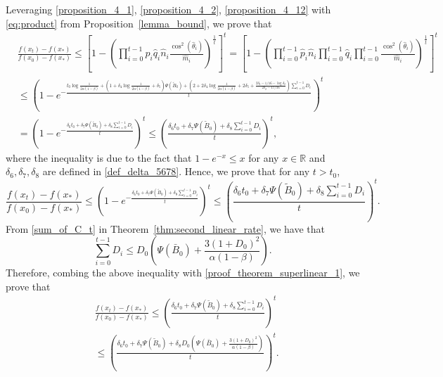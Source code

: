 \documentclass[11pt,letterpaper]{article}
\newcommand\0{{\Vector{0}}}
\newcommand\1{{\Vector{1}}}
\numberwithin{assumption}{section}
\numberwithin{definition}{section}
\numberwithin{theorem}{section}
\numberwithin{remark}{section}
\begin{document}
    Leveraging \eqref{proposition_4_1}, \eqref{proposition_4_2}, \eqref{proposition_4_12} with \eqref{eq:product} from Proposition~\ref{lemma_bound}, we prove that
    \begin{align*}
        & \frac{f(x_{t}) - f(x_*)}{f(x_{0}) - f(x_*)} \leq \left[1 - \left(\prod_{i = 0}^{t - 1} \hat{p}_i \hat{q}_{i} \hat{n}_i\frac{\cos^2(\hat{\theta}_{i})}{\hat{m}_{i}}\right)^{\frac{1}{t}}\right]^{t} = \left[1 - \left(\prod_{i = 0}^{t - 1} \hat{p}_i \hat{n}_{i} \prod_{i = 0}^{t - 1} \hat{q}_i \prod_{i = 0}^{t - 1}\frac{\cos^2(\hat{\theta}_{i})}{\hat{m}_{i}}\right)^{\frac{1}{t}}\right]^{t} \\
        & \leq \left(1 - e^{- \frac{t_0\log{\frac{1}{2\alpha(1 - \beta)}} + (1 + \delta_4\log{\frac{1}{2\alpha(1 - \beta)}} + \delta_5) \Psi(\tilde{B}_{0}) + (2 + 2\delta_4\log{\frac{1}{2\alpha(1 - \beta)}} + 2\delta_5 + \frac{2\delta_2 - 1/16 - \log{\delta_2}}{2\delta_2 - 17/16})\sum_{i = 0}^{t - 1}D_i}{t}}\right)^{t} \\
        & = \left(1 - e^{-\frac{\delta_6 t_0 + \delta_7 \Psi(\tilde{B}_0) + \delta_8 \sum_{i = 0}^{t - 1}D_i}{t}}\right)^{t} \leq \left(\frac{\delta_6 t_0 + \delta_7 \Psi(\tilde{B}_0) + \delta_8 \sum_{i = 0}^{t - 1}D_i}{t}\right)^{t},
    \end{align*}
    where the inequality is due to the fact that $1 - e^{-x} \leq x$ for any $x \in \mathbb{R}$ and $\delta_6, \delta_7, \delta_8$ are defined in \eqref{def_delta_5678}. Hence, we prove that for any $t > t_0$,
    \begin{equation}\label{proof_theorem_superlinear_1}
    \frac{f(x_{t}) - f(x_*)}{f(x_{0}) - f(x_*)} \leq \left(1 - e^{-\frac{\delta_6 t_0 + \delta_7 \Psi(\tilde{B}_0) + \delta_8 \sum_{i = 0}^{t - 1}D_i}{t}}\right)^{t} \leq \left(\frac{\delta_6 t_0 + \delta_7 \Psi(\tilde{B}_0) + \delta_8 \sum_{i = 0}^{t - 1}D_i}{t}\right)^{t}.
    \end{equation}
    From \eqref{sum_of_C_t} in Theorem~\ref{thm:second_linear_rate}, we have that
    \begin{equation}
        \sum_{i = 0}^{t - 1}D_i \leq D_0\left(\Psi(\bar{B}_{0}) + \frac{3(1 + D_0)^2}{\alpha(1 - \beta)}\right).
    \end{equation}
    Therefore, combing the above inequality with \eqref{proof_theorem_superlinear_1}, we prove that
    \begin{equation*}
    \begin{split}
        & \frac{f(x_{t}) - f(x_*)}{f(x_{0}) - f(x_*)} \leq \left(\frac{\delta_6 t_0 + \delta_7 \Psi(\tilde{B}_0) + \delta_8 \sum_{i = 0}^{t - 1}D_i}{t}\right)^{t} \\
        & \leq \left(\frac{\delta_6 t_0 + \delta_7 \Psi(\tilde{B}_0) + \delta_8 D_0\left(\Psi(\bar{B}_{0}) + \frac{3(1 + D_0)^2}{\alpha(1 - \beta)}\right)}{t}\right)^{t}.
    \end{split}
    \end{equation*}
\end{document}
